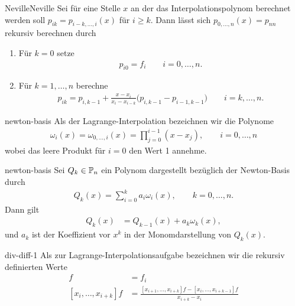 \begin{Algorithmus*}{Neville}{Neville}
  Sei für eine Stelle $x$ an der das Interpolationspolynom berechnet
  werden soll $p_{ik} = p_{i-k,\dots,i}(x)$ für $i\ge k$. Dann lässt
  sich $p_{0,\dots,n}(x) = p_{nn}$ rekursiv berechnen durch
  \begin{enumerate}
  \item Für $k=0$ setze
    \begin{gather}
      p_{i0} = f_i \qquad i=0,\dots,n.
    \end{gather}
  \item Für $k=1,\dots,n$ berechne
    \begin{gather}
      p_{ik} = p_{i,k-1} + \frac{x-x_i}{x_i-x_{i-k}}
      \bigl( p_{i,k-1} - p_{i-1,k-1} \bigr)
      \qquad i=k,\dots,n.
    \end{gather}
  \end{enumerate}
\end{Algorithmus*}

\begin{Definition}{newton-basis}
  Als  der Lagrange-Interpolation bezeichnen wir
  die Polynome
  \begin{gather}
    \omega_i(x)
    = \omega_{0,\dots,i}(x)
    = \prod_{j=0}^{i-1} (x-x_j),
    \qquad i=0,\dots,n
  \end{gather}
  wobei das leere Produkt für $i=0$ den Wert 1 annehme.
\end{Definition}

\begin{Lemma}{newton-basis}
  Sei $Q_k\in \P_n$ ein Polynom dargestellt bezüglich der Newton-Basis
  durch
  \begin{gather}
    Q_k(x) = \sum_{i=0}^k a_i \omega_i(x),\qquad k=0,\dots,n.
  \end{gather}
  Dann gilt
  \begin{align}
    Q_k(x) &= Q_{k-1}(x) + a_k \omega_k(x),
  \end{align}
  und $a_k$ ist der Koeffizient vor $x^k$ in der Monomdarstellung von
  $Q_k(x)$.
\end{Lemma}

\begin{Definition}{div-diff-1}
  Als  zur
  Lagrange-Interpolationsaufgabe bezeichnen wir die rekursiv
  definierten Werte
  \begin{align}
    [x_i]f
    &= f_i \\
    [x_i,\dots,x_{i+k}]f
    &= \frac{[x_{i+1},\dots,x_{i+k}]f - [x_i,\dots,x_{i+k-1}]f}{x_{i+k}-x_i}
  \end{align}
\end{Definition}

